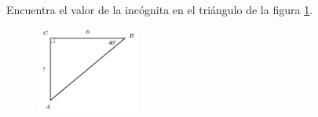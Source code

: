 \question[15]  Encuentra el valor de la incógnita en el triángulo de la figura \ref{fig:lados_functrig_21}.
\begin{figure}[H]
    \begin{center}
        \includegraphics[width=0.3\textwidth]{../images/lados_functrig_21.png}
    \end{center}
    \caption{}
    \label{fig:lados_functrig_21}
\end{figure}